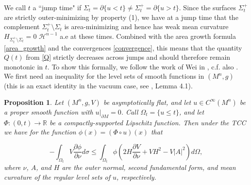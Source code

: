\documentclass[12pt]{amsart}
\newtheorem{proposition}[theorem]{Proposition}
\theoremstyle{definition}
\numberwithin{equation}{section}
\begin{document}
We call $t$ a ``jump time" if $\Sigma_{t} = \partial \{ u < t \} \neq \Sigma_{t}^{+}= \partial \{ u > t \}$. Since the surfaces $\Sigma^{+}_{t}$ are strictly outer-minimizing by property (1), we have at a jump time that the complement $\Sigma^{+}_{t} \setminus \Sigma_{t}$ is area-minimizing and hence has weak mean curvature $H_{\Sigma^{+}_{t} \setminus \Sigma_{t}}=0$ $\mathcal{H}^{n-1}$ a.e at these times. Combined with the area growth formula \eqref{area_growth} and the convergences \eqref{convergence}, this means that the quantity $Q(t)$ from \eqref{Q} strictly decreases across jumps and should therefore remain monotonic in $t$. To show this formally, we follow the work of Wei in \cite{W18}, c.f. also \cite{FS13}. We first need an inequality for the level sets of smooth functions in $(M^{n},g)$ (this is an exact identity in the vacuum case, see \cite{W18}, Lemma 4.1).
\begin{proposition}
Let $(M^{n},g,V)$ be asymptotically flat, and let $u \in C^{\infty}(M^{n})$ be a proper smooth function with $u|_{\partial M} = 0$. Call $\Omega_{t} = \{ u \leq t \}$, and let $\Phi: (0,t) \rightarrow \mathbb{R}$ be a compactly-supported Lipschitz function. Then under the TCC we have for the function $\phi(x) = (\Phi \circ u)(x)$ that

\begin{equation} \label{integral_identity}
    - \int_{\Omega_{t}} V \frac{\partial \phi}{\partial \nu} d\sigma \leq \int_{\Omega_{t}} \phi \left( 2 H \frac{\partial V}{\partial \nu} +VH^{2} - V|A|^{2} \right) d\Omega,
\end{equation}
where $\nu$, $A$, and $H$ are the outer normal, second fundamental form, and mean curvature of the regular level sets of $u$, respectively.
\end{proposition}
\end{document}

